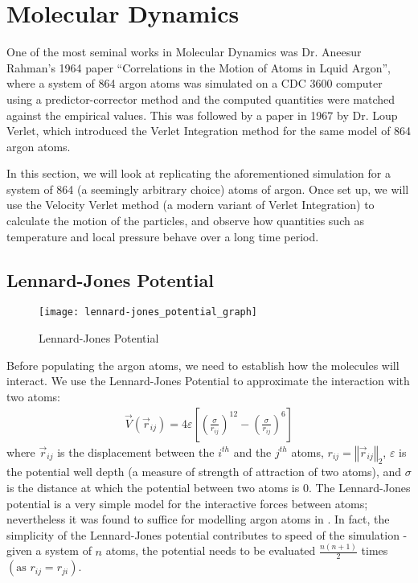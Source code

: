 \documentclass[../Main.tex]{subfiles}
\begin{document}
\section{Molecular Dynamics}

One of the most seminal works in Molecular Dynamics was Dr. Aneesur Rahman's 1964 paper \cite{Rahman1964} ``Correlations in the Motion of Atoms in Lquid Argon'', where a system of 864 argon atoms was simulated on a CDC 3600 computer using a predictor-corrector method and the computed quantities were matched against the empirical values. This was followed by a paper in 1967 \cite{Verlet1967} by Dr. Loup Verlet, which introduced the Verlet Integration method for the same model of 864 argon atoms.

In this section, we will look at replicating the aforementioned simulation for a system of 864 (a seemingly arbitrary choice) atoms of argon. Once set up, we will use the Velocity Verlet method (a modern variant of Verlet Integration) to calculate the motion of the particles, and observe how quantities such as temperature and local pressure behave over a long time period.

\subsection{Lennard-Jones Potential}

\begin{wrapfigure}{r}{0.5\textwidth}
\centering
\texttt{[image: lennard-jones\_potential\_graph]}
\caption{Lennard-Jones Potential}
\label{fig:lennard-jones_potential}
\end{wrapfigure}

Before populating the argon atoms, we need to establish how the molecules will interact. We use the Lennard-Jones Potential to approximate the interaction with two atoms:
\begin{align}
	\vec{V}\left(\vec{r}_{ij}\right) = 4\varepsilon \left[ \left( \frac{\sigma}{r_{ij}}\right)^{12} - \left( \frac{\sigma}{r_{ij}}\right)^{6} \right] \label{eqn:lennard-jones_potential}
\end{align}
where $\vec{r}_{ij}$ is the displacement between the $i^{th}$ and the $j^{th}$ atoms, $r_{ij} = \left\Vert\vec{r}_{ij}\right\Vert_{2}$, $\varepsilon$ is the potential well depth (a measure of strength of attraction of two atoms), and $\sigma$ is the distance at which the potential between two atoms is 0. The Lennard-Jones potential is a very simple model for the interactive forces between atoms; nevertheless it was found to suffice for modelling argon atoms in \cite{Rahman1964}. In fact, the simplicity of the Lennard-Jones potential contributes to speed of the simulation - given a system of $n$ atoms, the potential needs to be evaluated $\frac{n\left(n+1\right)}{2}$ times $\left(\mbox{as }r_{ij} = r_{ji}\right)$.
\end{document}
